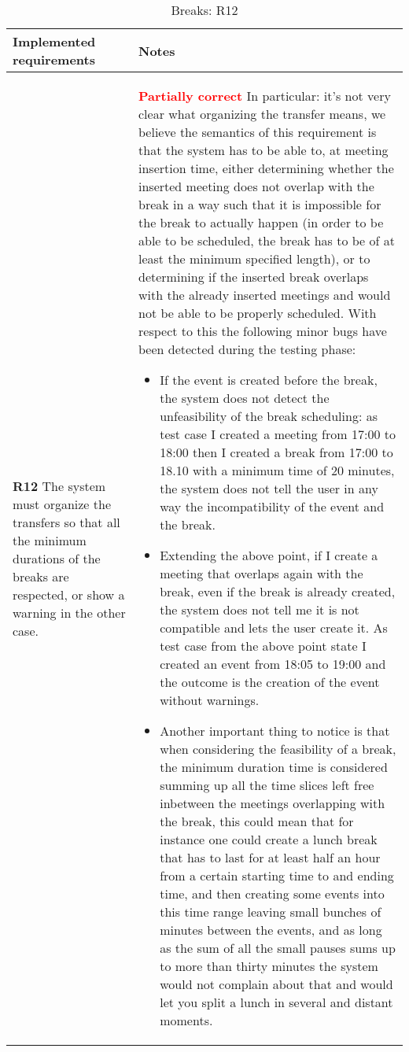 \begin{flushleft}

\begin{table}[htp]

\begin{tabular}{p{3cm}|p{10cm}}
\bf\large Implemented requirements&\bf\large Notes\\
\hline
\hline
\textbf{R12} The system must organize the transfers so that all the minimum durations of the breaks are respected, or show a warning in the other case.&\textbf{\textcolor{red}{\large Partially correct}}
In particular: it's not very clear what organizing the transfer means, we believe the semantics of this requirement is that the system has to be able to, at meeting insertion time, either determining whether the inserted meeting does not overlap with the break in a way such that it is impossible for the break to actually happen (in order to be able to be scheduled, the break has to be of at least the minimum specified length), or to determining if the inserted break overlaps with the already inserted meetings and would not be able to be properly scheduled. With respect to this the following minor bugs have been detected during the testing phase:
\begin{itemize}
\item If the event is created before the break, the system does not detect the unfeasibility of the break scheduling: as test case I created a meeting from 17:00 to 18:00 then I created a break from 17:00 to 18.10 with a minimum time of 20 minutes, the system does not tell the user in any way the incompatibility of the event and the break.
\item Extending the above point, if I create a meeting that overlaps again with the break, even if the break is already created, the system does not tell me it is not compatible and lets the user create it. As test case from the above point state I created an event from 18:05 to 19:00 and the outcome is the creation of the event without warnings.
\item Another important thing to notice is that when considering the feasibility of a break, the minimum duration time is considered summing up all the time slices left free inbetween the meetings overlapping with the break, this could mean that for instance one could create a lunch break that has to last for at least half an hour from a certain starting time to and ending time, and then creating some events into this time range leaving small bunches of minutes between the events, and as long as the sum of all the small pauses sums up to more than thirty minutes the system would not complain about that and would let you split a lunch in several and distant moments.
\end{itemize}
\\
\hline

\end{tabular}

\caption{Breaks: R12} 
\label{tab:R12}

\end{table}

\end{flushleft}
